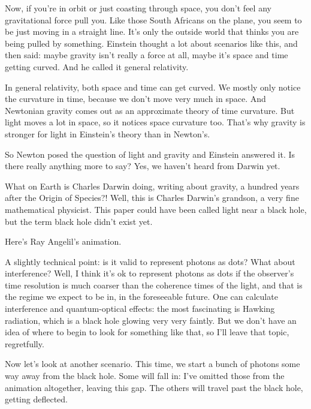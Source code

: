 Now, if you're in orbit or just coasting through space, you don't feel
any gravitational force pull you.  Like those South Africans on the
plane, you seem to be just moving in a straight line.  It's only the
outside world that thinks you are being pulled by something.  Einstein
thought a lot about scenarios like this, and then said: maybe gravity
isn't really a force at all, maybe it's space and time getting curved.
And he called it general relativity.

In general relativity, both space and time can get curved.  We mostly
only notice the curvature in time, because we don't move very much in
space.  And Newtonian gravity comes out as an approximate theory of
time curvature.  But light moves a lot in space, so it notices space
curvature too.  That's why gravity is stronger for light in Einstein's
theory than in Newton's.

So Newton posed the question of light and gravity and Einstein
answered it.  Is there really anything more to say?  Yes, we haven't
heard from Darwin yet.

\next

What on Earth is Charles Darwin doing, writing about gravity, a
hundred years after the Origin of Species?!  Well, this is Charles
Darwin's grandson, a very fine mathematical physicist. This paper
could have been called light near a black hole, but the term black
hole didn't exist yet.

\next

Here's Ray Angelil's animation.

A slightly technical point: is it valid to represent photons as dots?
What about interference?  Well, I think it's ok to represent photons
as dots if the observer's time resolution is much coarser than the
coherence times of the light, and that is the regime we expect to be
in, in the foreseeable future.  One can calculate interference and
quantum-optical effects: the most fascinating is Hawking radiation,
which is a black hole glowing very very faintly.  But we don't have an
idea of where to begin to look for something like that, so I'll leave
that topic, regretfully.

\next

Now let's look at another scenario.  This time, we start a bunch of
photons some way away from the black hole.  Some will fall in: I've
omitted those from the animation altogether, leaving this gap.  The
others will travel past the black hole, getting deflected.

\next


